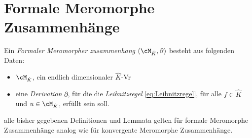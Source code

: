 \section{Formale Meromorphe Zusammenhänge}

\begin{defn}
  Ein \emph{Formaler Meromorpher zusammenhang} $(\cM_{\hat{K}},\partial)$ besteht aus
  folgenden Daten:
  \begin{itemize}
    \item $\cM_{\hat{K}}$, ein endlich dimensionaler $\hat K$-Vr
    \item eine \emph{Derivation} $\partial$, für die die \emph{Leibnitzregel}
      \eqref{eq:Leibnitzregel}, für alle $f\in \hat K$ und $u\in \cM_{\hat K}$,
      erfüllt sein soll.
  \end{itemize}
\end{defn}

\begin{comment}
  Oder einfach ein Meromorpher Zshg. über anderes $K$ also $\hat K$
\end{comment}

\begin{bem}
  alle bisher gegebenen Definitionen und Lemmata gelten für formale Meromorphe
  Zusammenhänge analog wie für konvergente Meromorphe Zusammenhänge.
\end{bem}

\begin{comment}
  \section{Elementare Meromorphe Zusammenhänge}

  \begin{defn}[Elementarer formaler Zusammenhang]
    \cite[Def 2.1]{sabbah_Fourier-local}
    Zu einem gegebenen $\rho\in u\C\llbracket u\rrbracket$,
    $\phi\in\C(\!(u)\!)$ und einem endlich dimensionalen
    $\C(\!(u)\!)$-Vektorraum $R$ mit regulärem Zusammenhang $\nabla$,
    definieren wir den assoziierten Elementaren endlich dimensionalen
    $\C(\!(t)\!)$-Vektorraum mit Zusammenhang, durch:
    \[
      El(\rho,\phi,R)=\rho_+(\sE^\phi\otimes R)
    \]
  \end{defn}
\end{comment}

